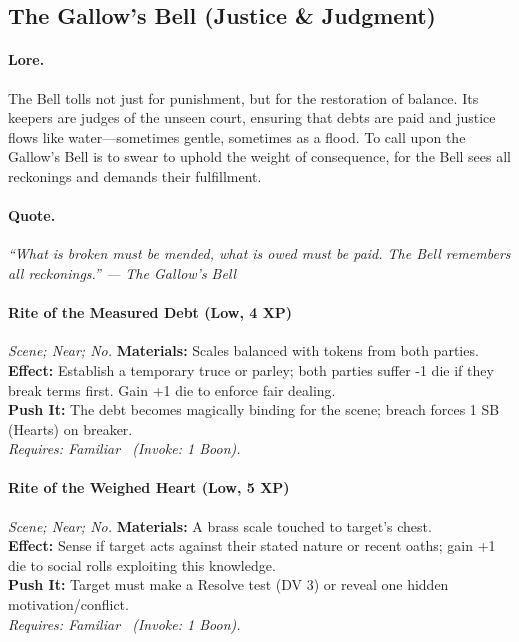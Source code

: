 \subsection{The Gallow's Bell (Justice \& Judgment)}

\paragraph{Lore.}
The Bell tolls not just for punishment, but for the restoration of balance. Its keepers are judges of the unseen court, ensuring that debts are paid and justice flows like water—sometimes gentle, sometimes as a flood. To call upon the Gallow's Bell is to swear to uphold the weight of consequence, for the Bell sees all reckonings and demands their fulfillment.

\paragraph{Quote.}
\emph{“What is broken must be mended, what is owed must be paid. The Bell remembers all reckonings.” — The Gallow's Bell}

\paragraph{Rite of the Measured Debt (Low, 4 XP)} \emph{Scene; Near; No.}
\textbf{Materials:} Scales balanced with tokens from both parties. \\
\textbf{Effect:} Establish a temporary truce or parley; both parties suffer -1 die if they break terms first. Gain +1 die to enforce fair dealing. \\
\textbf{Push It:} The debt becomes magically binding for the scene; breach forces 1 SB (Hearts) on breaker. \\
\emph{Requires: Familiar \ (\textit{Invoke:} 1 Boon).}

\paragraph{Rite of the Weighed Heart (Low, 5 XP)} \emph{Scene; Near; No.}
\textbf{Materials:} A brass scale touched to target's chest. \\
\textbf{Effect:} Sense if target acts against their stated nature or recent oaths; gain +1 die to social rolls exploiting this knowledge. \\
\textbf{Push It:} Target must make a Resolve test (DV 3) or reveal one hidden motivation/conflict. \\
\emph{Requires: Familiar \ (\textit{Invoke:} 1 Boon).}

